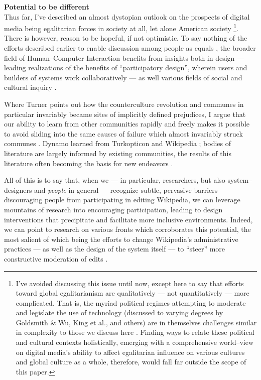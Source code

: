 \documentclass[11pt,titlepage]{article}
\newcommand{\sectitle}[1]{\textbf{#1}\\}
\begin{document}











\sectitle{Potential to be different}
Thus far, I've described an almost dystopian outlook on
the prospects of digital media being egalitarian forces in society at all,
let alone American society%
  \footnote{I've avoided discussing this issue until now,
  except here to say that efforts toward global egalitarianism are qualitatively
  --- not quantitatively ---
  more complicated.
  That is, the myriad political regimes attempting to moderate and legislate the use of technology
  (discussed to varying degrees by Goldsmith \& Wu, King et al., and others)
  are in themselves challenges similar in complexity to those we discuss here
  \cite{goldsmith2006controls,king2013censorship,king2014reverse}.
  Finding ways to relate these political and cultural contexts holistically,
  emerging with a comprehensive world--view on digital media's ability to affect egalitarian influence
  on various cultures and global culture as a whole, therefore,
  would fall far outside the scope of this paper.}.
%
There is however, reason to be hopeful, if not optimistic.
To say nothing of the efforts described earlier to enable discussion among people as equals
\cite{turkopticon,dynamo},
the broader field of Human--Computer Interaction benefits from insights both in design
--- leading realizations of the benefits of ``participatory design'',
wherein users and builders of systems work collaboratively ---
as well various fields of social and cultural inquiry
\cite{bodker1991cooperative,successfulOnlineCommunities}.

Where Turner points out how the counterculture revolution
and communes in particular
invariably became sites of implicitly defined prejudices,
I argue that our ability to learn from other communities rapidly and freely makes it possible
to avoid sliding into the same causes of failure which almost invariably struck communes
\cite{turner2005counterculture}.
Dynamo learned from Turkopticon and Wikipedia
\cite{dynamo,turkopticon};
bodies of literature are largely informed by existing communities,
the results of this literature often becoming the basis for new endeavors
\cite{bernstein20114chan,horowitz2010anatomy,Nov:2007:MW:1297797.1297798,wikipediansBornNotMade}.

All of this is to say that,
when we
--- in particular, researchers, but also system--designers and \textit{people} in general ---
recognize subtle, pervasive barriers discouraging people from participating in editing Wikipedia,
we can leverage mountains of research into encouraging participation,
leading to design interventions that precipitate and facilitate more inclusive environments.
Indeed, we can point to research on various fronts which corroborates this potential,
the most salient of which being the efforts to change Wikipedia's administrative practices
--- as well as the design of the system itself ---
to ``steer'' more constructive moderation of edits
\cite{ciampaglia2015moodbar,kraut2010dealing,pal2011early}.
\end{document}
